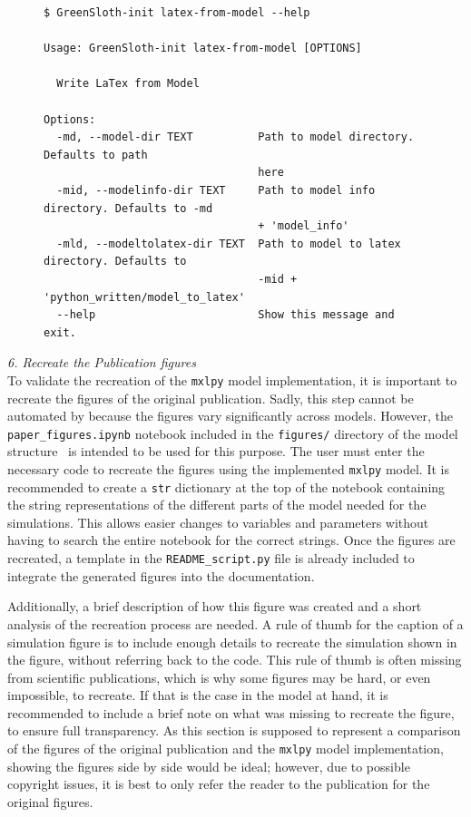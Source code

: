 \begin{figure}
\begin{lstlisting}[style=bashstyle, caption={\textbf{The latex-from-model command of the CLI of \greensloth[GreenSlothUtils]}}, label={code:greenslothutils-latex-from-model}]
$ GreenSloth-init latex-from-model --help

Usage: GreenSloth-init latex-from-model [OPTIONS]

  Write LaTex from Model

Options:
  -md, --model-dir TEXT          Path to model directory. Defaults to path
                                 here
  -mid, --modelinfo-dir TEXT     Path to model info directory. Defaults to -md
                                 + 'model_info'
  -mld, --modeltolatex-dir TEXT  Path to model to latex directory. Defaults to
                                 -mid + 'python_written/model_to_latex'
  --help                         Show this message and exit.

\end{lstlisting}
\end{figure}

\emph{6. Recreate the Publication figures}\\
To validate the recreation of the \verb|mxlpy| model implementation, it is important to recreate the figures of the original publication. Sadly, this step cannot be automated by \greensloth[GreenSlothUtils] because the figures vary significantly across models. However, the \verb|paper_figures.ipynb| notebook included in the \verb|figures/| directory of the model structure~ is intended to be used for this purpose. The user must enter the necessary code to recreate the figures using the implemented \verb|mxlpy| model. It is recommended to create a \verb|str| dictionary at the top of the notebook containing the string representations of the different parts of the model needed for the simulations. This allows easier changes to variables and parameters without having to search the entire notebook for the correct strings. Once the figures are recreated, a template in the \verb|README_script.py| file is already included to integrate the generated figures into the documentation.

Additionally, a brief description of how this figure was created and a short analysis of the recreation process are needed. A rule of thumb for the caption of a simulation figure is to include enough details to recreate the simulation shown in the figure, without referring back to the code. This rule of thumb is often missing from scientific publications, which is why some figures may be hard, or even impossible, to recreate. If that is the case in the model at hand, it is recommended to include a brief note on what was missing to recreate the figure, to ensure full transparency. As this section is supposed to represent a comparison of the figures of the original publication and the \verb|mxlpy| model implementation, showing the figures side by side would be ideal; however, due to possible copyright issues, it is best to only refer the reader to the publication for the original figures.

